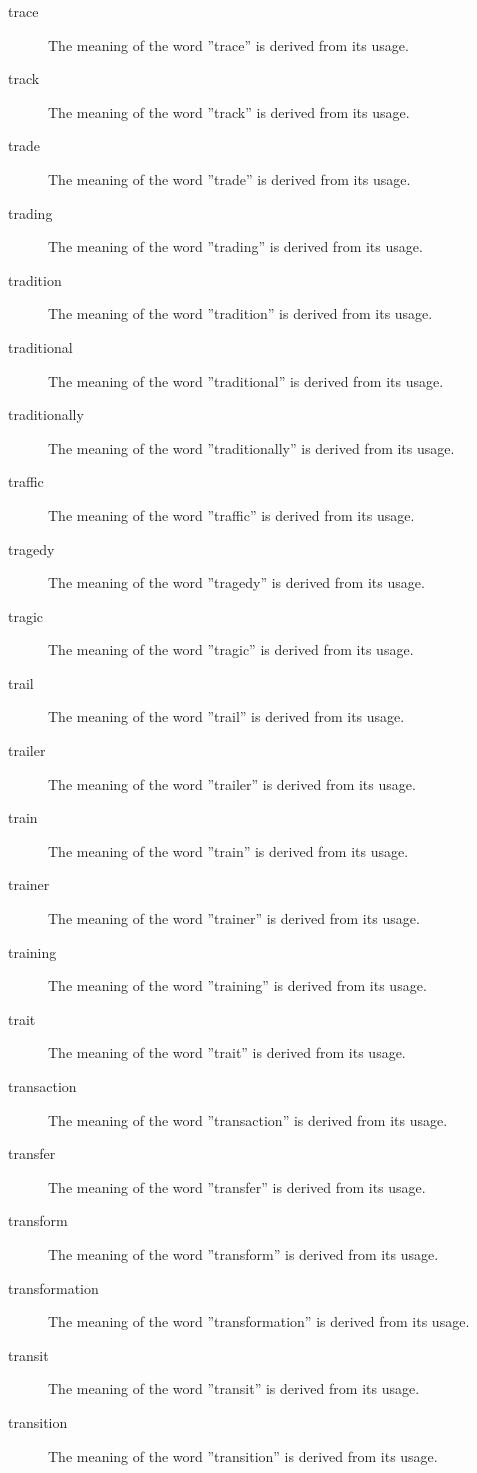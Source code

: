 \documentclass[12pt, letterpaper]{memoir}
\begin{document}
\begin{description}
\item[trace] The meaning of the word ''trace'' is derived from its usage.
\item[track] The meaning of the word ''track'' is derived from its usage.
\item[trade] The meaning of the word ''trade'' is derived from its usage.
\item[trading] The meaning of the word ''trading'' is derived from its usage.
\item[tradition] The meaning of the word ''tradition'' is derived from its usage.
\item[traditional] The meaning of the word ''traditional'' is derived from its usage.
\item[traditionally] The meaning of the word ''traditionally'' is derived from its usage.
\item[traffic] The meaning of the word ''traffic'' is derived from its usage.
\item[tragedy] The meaning of the word ''tragedy'' is derived from its usage.
\item[tragic] The meaning of the word ''tragic'' is derived from its usage.
\item[trail] The meaning of the word ''trail'' is derived from its usage.
\item[trailer] The meaning of the word ''trailer'' is derived from its usage.
\item[train] The meaning of the word ''train'' is derived from its usage.
\item[trainer] The meaning of the word ''trainer'' is derived from its usage.
\item[training] The meaning of the word ''training'' is derived from its usage.
\item[trait] The meaning of the word ''trait'' is derived from its usage.
\item[transaction] The meaning of the word ''transaction'' is derived from its usage.
\item[transfer] The meaning of the word ''transfer'' is derived from its usage.
\item[transform] The meaning of the word ''transform'' is derived from its usage.
\item[transformation] The meaning of the word ''transformation'' is derived from its usage.
\item[transit] The meaning of the word ''transit'' is derived from its usage.
\item[transition] The meaning of the word ''transition'' is derived from its usage.

\end{description}
\end{document}
